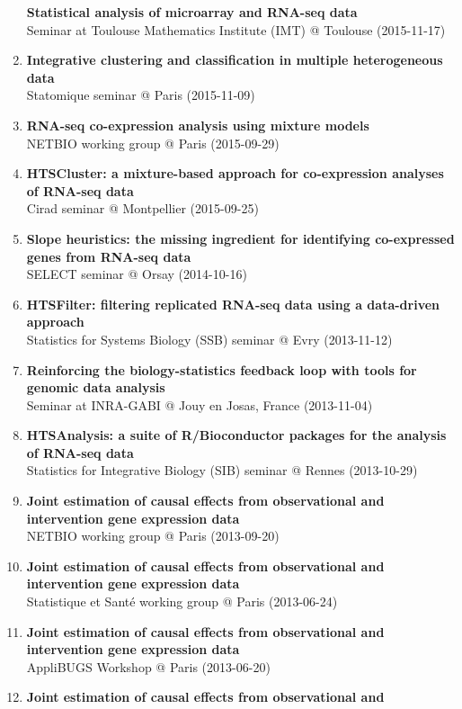 \documentclass[11pt, a4paper]{awesome-cv}
\begin{document}
\begin{enumerate}
  \textbf{Statistical analysis of microarray and RNA-seq data}\\
  Seminar at Toulouse Mathematics Institute (IMT) @ Toulouse
  (2015-11-17)
\item
  \textbf{Integrative clustering and classification in multiple
  heterogeneous data}\\
  Statomique seminar @ Paris (2015-11-09)
\item
  \textbf{RNA-seq co-expression analysis using mixture models}\\
  NETBIO working group @ Paris (2015-09-29)
\item
  \textbf{HTSCluster: a mixture-based approach for co-expression
  analyses of RNA-seq data}\\
  Cirad seminar @ Montpellier (2015-09-25)
\item
  \textbf{Slope heuristics: the missing ingredient for identifying
  co-expressed genes from RNA-seq data}\\
  SELECT seminar @ Orsay (2014-10-16)
\item
  \textbf{HTSFilter: filtering replicated RNA-seq data using a
  data-driven approach}\\
  Statistics for Systems Biology (SSB) seminar @ Evry (2013-11-12)
\item
  \textbf{Reinforcing the biology-statistics feedback loop with tools
  for genomic data analysis}\\
  Seminar at INRA-GABI @ Jouy en Josas, France (2013-11-04)
\item
  \textbf{HTSAnalysis: a suite of R/Bioconductor packages for the
  analysis of RNA-seq data}\\
  Statistics for Integrative Biology (SIB) seminar @ Rennes (2013-10-29)
\item
  \textbf{Joint estimation of causal effects from observational and
  intervention gene expression data}\\
  NETBIO working group @ Paris (2013-09-20)
\item
  \textbf{Joint estimation of causal effects from observational and
  intervention gene expression data}\\
  Statistique et Santé working group @ Paris (2013-06-24)
\item
  \textbf{Joint estimation of causal effects from observational and
  intervention gene expression data}\\
  AppliBUGS Workshop @ Paris (2013-06-20)
\item
  \textbf{Joint estimation of causal effects from observational and
}
\end{enumerate}
\end{document}
